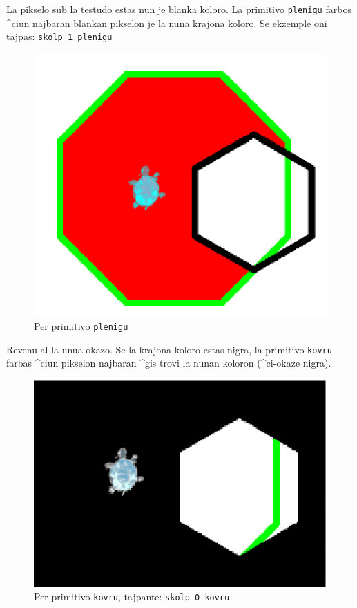La pikselo sub la testudo estas nun je blanka koloro.  
La primitivo \texttt{plenigu} farbos ^ciun najbaran blankan pikselon je la
nuna krajona koloro.  Se ekzemple oni tajpas: \texttt{skolp 1 plenigu}

\begin{figure}[h]
  \begin{center}
    \includegraphics*[scale=0.2]{bildoj/remplis1.png}
    \caption {Per primitivo \texttt{plenigu}}
  \end{center}
\end{figure}

Revenu al la unua okazo.  Se la krajona koloro estas nigra, la
primitivo \texttt{kovru} farbas ^ciun pikselon najbaran ^gis trovi la
nunan koloron (^ci-okaze nigra).
\begin{figure}[h]
  \begin{center}
    \includegraphics*[scale=0.2]{bildoj/remplis2.png}
    \caption {Per primitivo \texttt{kovru}, tajpante: \texttt{skolp 0 kovru}}
  \end{center}
\end{figure}

